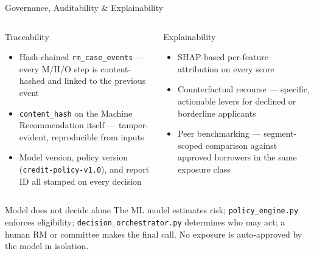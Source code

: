 \documentclass[9pt,aspectratio=169]{beamer}
\begin{document}
\begin{frame}{Governance, Auditability \& Explainability}
\vspace{-2pt}
\begin{columns}[T]
    \begin{block}{Traceability}
      \footnotesize
      \begin{itemize}\setlength\itemsep{3pt}
        \item[\small$\bullet$] Hash-chained \texttt{rm\_case\_events} --- every M/H/O step is
              content-hashed and linked to the previous event
        \item[\small$\bullet$] \texttt{content\_hash} on the Machine Recommendation itself ---
              tamper-evident, reproducible from inputs
        \item[\small$\bullet$] Model version, policy version (\texttt{credit-policy-v1.0}), and
              report ID all stamped on every decision
      \end{itemize}
    \end{block}
    \begin{block}{Explainability}
      \footnotesize
      \begin{itemize}\setlength\itemsep{3pt}
        \item[\small$\bullet$] SHAP-based per-feature attribution on every score
        \item[\small$\bullet$] Counterfactual recourse --- specific, actionable levers for declined
              or borderline applicants
        \item[\small$\bullet$] Peer benchmarking --- segment-scoped comparison against approved
              borrowers in the same exposure class
      \end{itemize}
    \end{block}
\end{columns}
\vspace{8pt}
\begin{alertblock}{Model does not decide alone}
  \footnotesize
  The ML model estimates risk; \texttt{policy\_engine.py} enforces eligibility; \texttt{decision\_orchestrator.py}
  determines who may act; a human RM or committee makes the final call. No exposure is
  auto-approved by the model in isolation.
\end{alertblock}
\end{frame}
\end{document}
